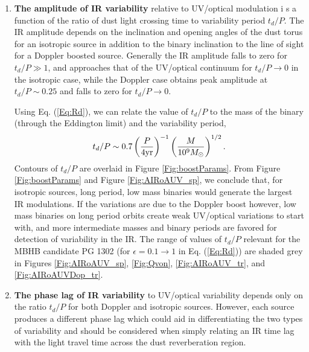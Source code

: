 \begin{enumerate}
\item{
\textbf{The amplitude of IR variability} relative to UV/optical modulation i s
a function of the ratio of dust light crossing time to variability period
$t_d/P$. The IR amplitude depends on the inclination and opening angles of the
dust torus for an isotropic source in addition to the binary inclination to
the line of sight for a Doppler boosted source. Generally the IR amplitude
falls to zero for $t_d/P \gg 1$, and approaches that of the UV/optical
continuum for $t_d/P \rightarrow 0$ in the isotropic case, while the Doppler
case obtains peak amplitude at $t_d/P \sim 0.25$ and falls to zero for $t_d/P
\rightarrow 0$.


Using Eq. (\ref{Eq:Rd}), we can relate the value of $t_d/P$ to the mass of the
binary (through the Eddington limit) and the variability period,
\begin{equation}
t_d/P \sim 0.7 \left(\frac{P}{4 \rm{yr} } \right)^{-1} \left(\frac{M}{10^9 {M_{\odot}} } \right)^{1/2}.
\end{equation}
Contours of $t_d/P$ are overlaid in Figure \ref{Fig:boostParams}. From Figure
\ref{Fig:boostParams} and Figure \ref{Fig:AIRoAUV_sp}, we conclude that, for
isotropic sources, long period, low mass binaries would generate the largest
IR modulations. If the variations are due to the Doppler boost however, low
mass binaries on long period orbits create weak UV/optical variations to start
with, and more intermediate masses and binary periods are favored for
detection of variability in the IR. The range of values of $t_d/P$ relevant
for the MBHB candidate PG 1302 (for $\epsilon =0.1 \rightarrow 1$ in Eq.
(\ref{Eq:Rd})) are shaded grey in Figures \ref{Fig:AIRoAUV_sp}, \ref{Fig:Qvon},
\ref{Fig:AIRoAUV_tr}, and \ref{Fig:AIRoAUVDop_tr}. }

%
\item{ 
\textbf{The phase lag of IR variability} to UV/optical variability depends
only on the ratio $t_d/P$ for both Doppler and isotropic sources. However,
each source produces a different phase lag which could aid in differentiating
the two types of variability and should be considered when simply relating an
IR time lag with the light travel time across the dust reverberation region.

}
\end{enumerate}
